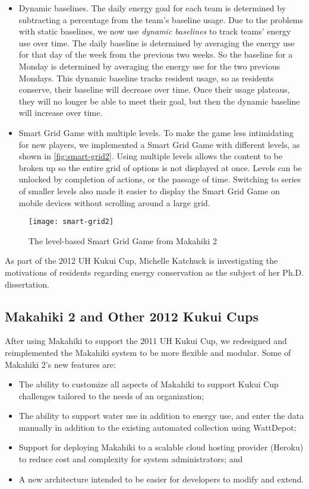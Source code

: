 \begin{itemize}
	\item Dynamic baselines. The daily energy goal for each team is determined by subtracting a percentage from the team's baseline usage. Due to the problems with static baselines, we now use \emph{dynamic baselines} to track teams' energy use over time. The daily baseline is determined by averaging the energy use for that day of the week from the previous two weeks. So the baseline for a Monday is determined by averaging the energy use for the two previous Mondays. This dynamic baseline tracks resident usage, so as residents conserve, their baseline will decrease over time. Once their usage plateaus, they will no longer be able to meet their goal, but then the dynamic baseline will increase over time.
	\item Smart Grid Game with multiple levels. To make the game less intimidating for new players, we implemented a Smart Grid Game with different levels, as shown in \autoref{fig:smart-grid2}. Using multiple levels allows the content to be broken up so the entire grid of options is not displayed at once. Levels can be unlocked by completion of actions, or the passage of time. Switching to series of smaller levels also made it easier to display the Smart Grid Game on mobile devices without scrolling around a large grid.
\end{itemize}

\begin{figure}[htbp]
	\centering
	\texttt{[image: smart-grid2]}
	\caption{The level-based Smart Grid Game from Makahiki 2}
	\label{fig:smart-grid2}
\end{figure}


As part of the 2012 UH Kukui Cup, Michelle Katchuck is investigating the motivations of residents regarding energy conservation as the subject of her Ph.D. dissertation.


\subsection{Makahiki 2 and Other 2012 Kukui Cups}
\label{sec:makahiki2}

After using Makahiki to support the 2011 UH Kukui Cup, we redesigned and reimplemented the Makahiki system to be more flexible and modular. Some of Makahiki 2's new features are:

\begin{itemize}
	\item The ability to customize all aspects of Makahiki to support Kukui Cup challenges tailored to the needs of an organization;
	\item The ability to support water use in addition to energy use, and enter the data manually in addition to the existing automated collection using WattDepot;
	\item Support for deploying Makahiki to a scalable cloud hosting provider (Heroku) to reduce cost and complexity for system administrators; and
	\item A new architecture intended to be easier for developers to modify and extend.
\end{itemize}


